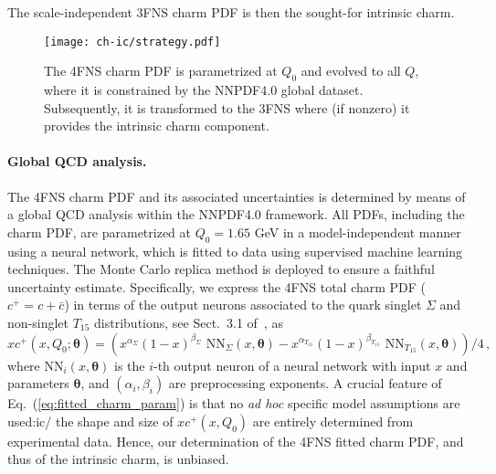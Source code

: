 The scale-independent 3FNS charm PDF is then the sought-for intrinsic
charm.

\begin{figure}[h]
\begin{center}
  \texttt{[image: ch-ic/strategy.pdf]}
 \end{center}
\vspace{-0.2cm}
\caption{The 4FNS charm PDF is parametrized  at $Q_0$
  and evolved to all  $Q$, where it is  constrained by the NNPDF4.0
  global dataset. 
 Subsequently, it is transformed to the 3FNS where (if nonzero) it
 provides the intrinsic charm component.
  \label{fig:ic/strategy}
}
\end{figure}

\paragraph{Global QCD analysis.}
%
The 4FNS charm PDF and its associated
uncertainties is determined by means of a global QCD analysis
within the NNPDF4.0 framework.
%
All PDFs, including the charm PDF, are  parametrized at $Q_0=1.65$ GeV in 
a model-independent manner using a neural network, which is fitted to data using 
supervised machine learning techniques.
The Monte Carlo replica method
is deployed to ensure a faithful uncertainty estimate.
%
Specifically, we express the 4FNS total charm PDF ($c^+=c+\bar{c}$)  in terms of the output neurons associated to the quark singlet $\Sigma$ and non-singlet $T_{15}$
distributions, see Sect.~3.1 of~\cite{Ball:2021leu}, as
\begin{equation}
\label{eq:ic/fitted_charm_param}
xc^+(x,Q_0;{\boldsymbol \theta}) =
\left( x^{\alpha_{\Sigma}}(1-x)^{\beta_{\Sigma}} \textrm{ NN}_{\Sigma}(x,{\boldsymbol \theta})-
x^{\alpha_{T_{15}}}(1-x)^{\beta_{T_{15}}} \textrm{ NN}_{T_{15}}(x,{\boldsymbol \theta})
\right)/4 \, ,
\end{equation}
where $\textrm{
  NN}_{i}(x,{\boldsymbol \theta})$ is the $i$-th output neuron of a
neural network with input $x$ and  parameters ${\boldsymbol \theta}$,
and 
$\left( \alpha_i,\beta_i\right) $ are
preprocessing exponents.
%
A crucial feature of Eq.~(\ref{eq:fitted_charm_param}) is that no \textit{ ad hoc} specific model assumptions are used:ic/ the shape and size of $xc^+(x,Q_0)$ are entirely determined from experimental data.
%
Hence, our determination of the 4FNS fitted charm PDF, and thus of the intrinsic charm, is unbiased.
%

